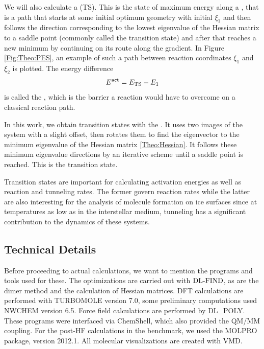 We will also calculate a  (TS). This
is the state of maximum energy along a , that is a path that
starts at some initial optimum geometry with initial 
$\xi_1$ and then follows the direction corresponding to the lowest eigenvalue of
the Hessian matrix to a saddle point (commonly called the transition state) and
after that reaches a new minimum by continuing on its route along the gradient. In Figure
\ref{Fig:Theo:PES}, an example of such a path between reaction coordinates
$\xi_1$ and $\xi_{2}$ is plotted. The energy difference 
\begin{equation}
E^{\text{act}}=E_{\text{TS}} - E_1
\end{equation}
is called the , which is the barrier a reaction would
have to overcome on a classical reaction path.

In this work, we obtain transition states with the 
.\cite{HenkelmanJonsson1999} It uses two images of the system with a slight
offset, then rotates them to find the eigenvector to the minimum eigenvalue of the Hessian
matrix \eqref{Theo:Hessian}. It follows these minimum eigenvalue directions by an
iterative scheme until a saddle point is reached. This is the transition state.

Transition states are important for calculating activation energies as well as
reaction and tunneling rates. The former govern reaction rates while the latter
are also interesting for the analysis of molecule formation on ice surfaces since at
temperatures as low as in the interstellar medium, tunneling has a significant
contribution to the dynamics of these systems.

\subsection{Technical Details}
\label{Sec:Theo:Technical}

Before proceeding to actual calculations, we want to mention the programs and tools 
used for these. The optimizations are carried out with
$\text{DL-FIND}$, \cite{Kaestner2009} as are the dimer method and the calculation of 
Hessian matrices. DFT calculations are performed with
TURBOMOLE version 7.0,\cite{TURBOMOLE} some preliminary computations used
NWCHEM version 6.5.\cite{ValievBylaskaGovindEtAl2010} Force field calculations
are performed by DL\_POLY.\cite{TodorovSmithTrachenkoEtAl2006} These programs
were interfaced via \mbox{ChemShell},\cite{chemshell,MetzKaestnerSokolEtAl2013}
which also provided the QM/MM coupling.
For the post-HF calculations in the benchmark, we used the MOLPRO
package, version 2012.1.\cite{MOLPRO_brief}
All molecular visualizations are created with VMD.\cite{HUMP96}

